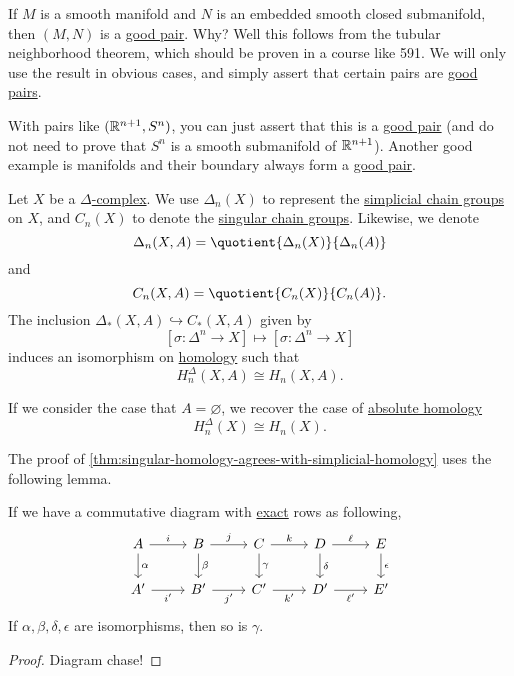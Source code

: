 \begin{remark}
	If \(M\) is a smooth manifold and \(N\) is an embedded smooth closed submanifold, then \((M, N)\) is a \hyperref[def:good-pair]{good pair}.
	Why? Well this follows from the tubular neighborhood theorem, which should be proven in a course like 591. We will only use the result
	in obvious cases, and simply assert that certain pairs are \hyperref[def:good-pair]{good pairs}.
\end{remark}

With pairs like \((\mathbb{\MakeUppercase{r}}^{n + 1}, S^n)\), you can just assert that this is a \hyperref[def:good-pair]{good pair} (and do
not need to prove that \(S^n\) is a smooth submanifold of \(\mathbb{\MakeUppercase{r}}^{n + 1}\)). Another good example is manifolds and their
boundary always form a \hyperref[def:good-pair]{good pair}.

\begin{theorem}\label{thm:singular-homology-agrees-with-simplicial-homology}
	Let \(X\) be a \hyperref[def:delta-complex]{\(\Delta\)-complex}. We use \(\Delta_n(X)\) to represent the
	\hyperref[def:simplicial-complex]{simplicial chain groups} on \(X\), and \(C_n(X)\) to denote the
	\hyperref[def:singular-chain]{singular chain groups}. Likewise, we denote
	\[
		\Delta_n(X, A) = \quotient{\Delta_n(X)}{\Delta_n(A)}
	\]
	and
	\[
		C_n(X, A) = \quotient{C_n(X)}{C_n(A)}.
	\]
	The inclusion \(\Delta_\ast(X, A) \hookrightarrow C_\ast(X, A)\) given by
	\[
		[\sigma \colon \Delta^n \to X] \mapsto [\sigma : \Delta^n \to X]
	\]
	induces an isomorphism on \hyperref[def:homology-group]{homology} such that
	\[
		H_n^\Delta(X, A) \cong H_n(X, A).
	\]

	If we consider the case that \(A = \varnothing\), we recover the case of \hyperref[def:homology-group]{absolute homology}
	\[
		H_n^\Delta(X) \cong H_n(X).
	\]
\end{theorem}
The proof of \autoref{thm:singular-homology-agrees-with-simplicial-homology} uses the following lemma.
\begin{lemma}\label{lma:the-five-lemma}
	If we have a commutative diagram with \hyperref[def:exact]{exact} rows as following,
	\[
		\begin{tikzcd}
			A & B & C & D & E \\
			{A^\prime} & {B^\prime} & {C^\prime} & {D^\prime} & {E^\prime}
			\arrow["\alpha", from=1-1, to=2-1]
			\arrow["\gamma", from=1-3, to=2-3]
			\arrow["\delta", from=1-4, to=2-4]
			\arrow["\epsilon", from=1-5, to=2-5]
			\arrow["{i^\prime}"', from=2-1, to=2-2]
			\arrow["\beta", from=1-2, to=2-2]
			\arrow["{j^\prime}"', from=2-2, to=2-3]
			\arrow["{k^\prime}"', from=2-3, to=2-4]
			\arrow["{\ell^\prime}"', from=2-4, to=2-5]
			\arrow["\ell", from=1-4, to=1-5]
			\arrow["k", from=1-3, to=1-4]
			\arrow["j", from=1-2, to=1-3]
			\arrow["i", from=1-1, to=1-2]
		\end{tikzcd}
	\]
	If \(\alpha, \beta, \delta, \epsilon\) are isomorphisms, then so is \(\gamma\).
\end{lemma}
\begin{proof}
	Diagram chase!
\end{proof}